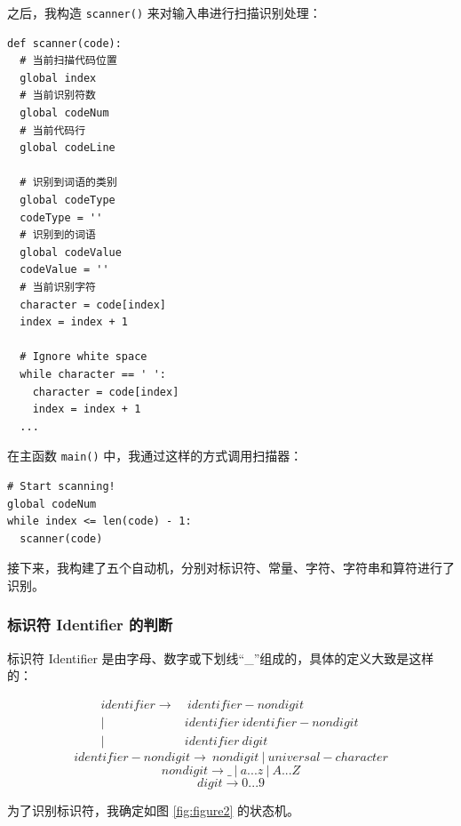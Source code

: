 \documentclass[UTF8]{ctexart}
\begin{document}
之后，我构造 \texttt{scanner()} 来对输入串进行扫描识别处理：

\begin{verbatim}
def scanner(code):
  # 当前扫描代码位置
  global index
  # 当前识别符数
  global codeNum
  # 当前代码行
  global codeLine

  # 识别到词语的类别
  global codeType
  codeType = ''
  # 识别到的词语
  global codeValue
  codeValue = ''
  # 当前识别字符
  character = code[index]
  index = index + 1

  # Ignore white space
  while character == ' ':
    character = code[index]
    index = index + 1
  ...
\end{verbatim}

在主函数 \texttt{main()} 中，我通过这样的方式调用扫描器：

\begin{verbatim}
# Start scanning!
global codeNum
while index <= len(code) - 1:
  scanner(code)
\end{verbatim}

接下来，我构建了五个自动机，分别对标识符、常量、字符、字符串和算符进行了识别。

\subsubsection{标识符 Identifier 的判断}
标识符 Identifier 是由字母、数字或下划线“\_”组成的，具体的定义大致是这样的：

\begin{equation}
\begin{split}
  identifier \rightarrow &\ identifier-nondigit \ \\ |\ & identifier\ identifier-nondigit \ \\ |\ & identifier\ digit
\end{split}
\end{equation}
\begin{equation}
  identifier-nondigit \rightarrow \ nondigit \ |\ universal-character
\end{equation}
\begin{equation}
  nondigit \rightarrow \_ \ |\ a ... z\ |\ A ... Z
\end{equation}
\begin{equation}
  digit \rightarrow 0 ... 9
\end{equation}

为了识别标识符，我确定如图 \ref{fig:figure2} 的状态机。
\end{document}
